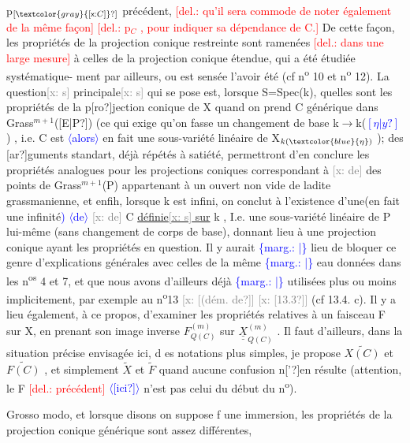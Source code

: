 \documentclass[11pt]{article}
\newcommand{\scanpage}[1]{\par\bigskip\noindent{\small\sffamily[scan #1]}\par}
\newcommand{\mspage}[1]{{\small\sffamily[p.\,#1]}}
\newcommand{\hand}[1]{\textcolor{blue}{#1}}
\newcommand{\inserted}[2][]{\textcolor{blue}{$\langle$#2$\rangle$}}
\newcommand{\margin}[1]{\textcolor{blue}{\{\textsf{marg.:} #1\}}}
\newcommand{\deleted}[1]{\textcolor{red}{[\textsf{del.:} #1]}}
\newcommand{\xout}[1]{\textcolor{gray}{[\textsf{x:} #1]}}
\newcommand{\uline}[1]{\underline{#1}}
\newcommand{\unsure}[1]{[#1?]}
\begin{document}
p$_{\unsure{\xout{C}}}$ précédent, \deleted{qu'il sera commode de noter également de la même façon}
\deleted{p$_C$ , pour indiquer sa dépendance de C.} De cette façon, les propriétés de
la projection conique  restreinte  sont ramenées \deleted{dans une large mesure} à
celles de la projection conique étendue, qui a été  étudiée systématique-%
ment par ailleurs, ou est sensée l'avoir été (cf n\textsuperscript{o} 10 et n\textsuperscript{o} 12). La
question\xout{s} principale\xout{s} qui se pose est, lorsque  S=Spec(k), quelles sont
les propriétés de la p\unsure{ro}jection conique  de X  quand on prend C générique
dans Grass$^{m+1}$(\unsure{E|P}) (ce qui exige  qu'on fasse un changement de base
k$\rightarrow$k(\hand{$\unsure{\eta|y}$}) , i.e.  C est \inserted{alors} en fait une sous-variété linéaire de X$_{k(\hand{\eta})}$ ); des
\unsure{ar}guments  standart, déjà répétés à satiété, permettront d'en conclure
les propriétés analogues pour les projections coniques correspondant à \xout{de}
des points de Grass$^{m+1}$(P)  appartenant à un ouvert non vide de ladite
grassmanienne, et enfih, lorsque k est infini, on conclut à l'existence
d'une(en fait une infinité\hand{)} \inserted{de} \xout{de} C  \uline{définie\xout{s} sur} k , I.e.  une sous-variété
linéaire de P lui-même (sans changement de corps de base), donnant lieu
à une projection conique ayant les propriétés en question. Il y aurait
\margin{|} lieu de bloquer ce genre d'explications générales avec celles de la même
\margin{|} eau données dans les n\textsuperscript{os} 4 et 7, et que nous avons d'ailleurs déjà
\margin{|} utilisées plus ou moins implicitement,  par exemple au n\textsuperscript{o}13 \xout{\unsure{(dém. de}}
\xout{\unsure{13.3}} (cf 13.4. c). Il y a lieu également, à ce propos, d'examiner les
propriétés relatives à un faisceau F sur X,  en prenant son image inverse
$F^{(m)}_{Q(C)}$  sur  $\underline{\underline{X}}^{(m)}_{Q(C)}$ . Il faut  d'ailleurs, dans la situation précise
envisagée ici, d es notations plus simples, je propose  $\widetilde{X(C)}$ et $\widetilde{F(C)}$ ,
et simplement $\widetilde{X}$ et $\widetilde{F}$  quand aucune confusion n\unsure{'}en résulte  (attention, le
F \deleted{précédent} \inserted{\unsure{ici}} n'est pas  celui du début du n\textsuperscript{o}).

Grosso modo, et lorsque  disons on suppose  f une immersion, les
propriétés de la projection conique générique sont assez différentes,

\mspage{\hand{86}}

\clearpage
\scanpage{25/87}
\mspage{81}
\end{document}
